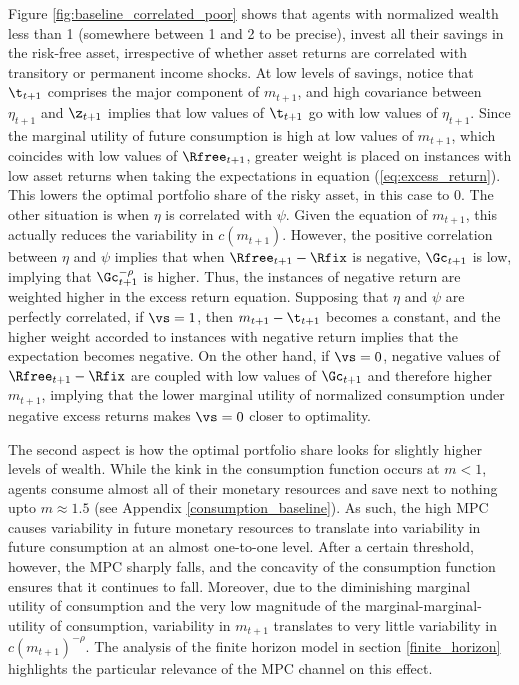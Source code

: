Figure \ref{fig:baseline_correlated_poor} shows that agents with normalized wealth less than 1 (somewhere between 1 and 2 to be precise), invest all their savings in the risk-free asset, irrespective of whether asset returns are correlated with transitory or permanent income shocks. At low levels of savings, notice that $\t_{t+1}$ comprises the major component of $m_{t+1}$, and high covariance between $\eta_{t+1}$ and $\z_{t+1}$ implies that low values of $\t_{t+1}$ go with low values of $\eta_{t+1}$. Since the marginal utility of future consumption is high at low values of $m_{t+1}$, which coincides with low values of $\Rfree_{t+1}$, greater weight is placed on instances with low asset returns when taking the expectations in equation (\ref{eq:excess_return}). This lowers the optimal portfolio share of the risky asset, in this case to 0. The other situation is when $\eta$ is correlated with $\psi$. Given the equation of $m_{t+1}$, this actually reduces the variability in $c(m_{t+1})$. However, the positive correlation between $\eta$ and $\psi$ implies that when $\Rfree_{t+1} - \Rfix$ is negative, $\Gc_{t+1}$ is low, implying that $\Gc_{t+1}^{-\rho}$ is higher. Thus, the instances of negative return are weighted higher in the excess return equation. Supposing that $\eta$ and $\psi$ are perfectly correlated, if $\vs = 1$, then $m_{t+1} - \t_{t+1}$ becomes a constant, and the higher weight accorded to instances with negative return implies that the expectation becomes negative. On the other hand, if $\vs = 0$, negative values of $\Rfree_{t+1} - \Rfix$ are coupled with low values of $\Gc_{t+1}$ and therefore higher $m_{t+1}$, implying that the lower marginal utility of normalized consumption under negative excess returns makes $\vs = 0$ closer to optimality.

The second aspect is how the optimal portfolio share looks for slightly higher levels of wealth. While the kink in the consumption function occurs at $m < 1$, agents consume almost all of their monetary resources and save next to nothing upto $m \approx 1.5$ (see Appendix \ref{consumption_baseline}). As such, the high MPC causes variability in future monetary resources to translate into variability in future consumption at an almost one-to-one level. After a certain threshold, however, the MPC sharply falls, and the concavity of the consumption function ensures that it continues to fall. Moreover, due to the diminishing marginal utility of consumption and the very low magnitude of the marginal-marginal-utility of consumption, variability in $m_{t+1}$ translates to very little variability in $c(m_{t+1})^{-\rho}$. The analysis of the finite horizon model in section \ref{finite_horizon} highlights the particular relevance of the MPC channel on this effect.

